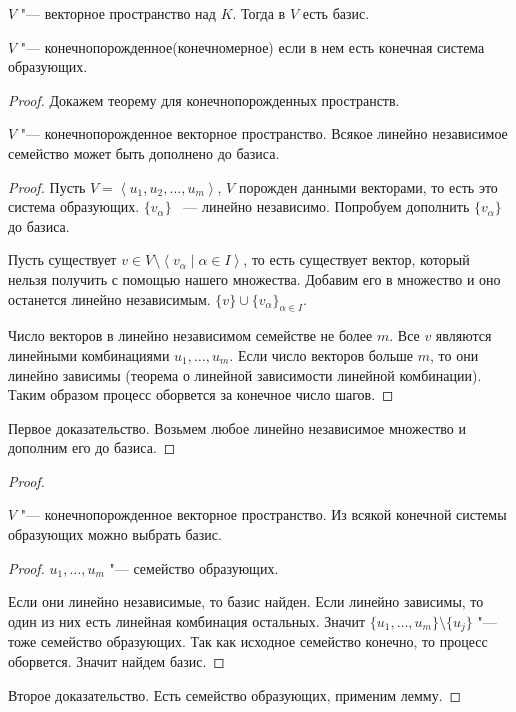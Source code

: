 \begin{theorem}
	$V$ "--- векторное пространство над $K$.
	Тогда в $V$ есть базис.
\end{theorem}

\begin{Def}
	$V$ "--- конечнопорожденное(конечномерное) если в нем есть
	конечная система образующих.
\end{Def}
\begin{proof}
	Докажем теорему для конечнопорожденных пространств.

	\begin{lemma}
		$V$ "--- конечнопорожденное векторное пространство.
		Всякое линейно независимое семейство может быть дополнено до базиса.
	\end{lemma}
	\begin{proof}
		Пусть $V = \left<u_1, u_2, \dots, u_m\right>$, $V$ порожден данными векторами, то есть это система образующих.
		$\{v_{\alpha}\}$ ~--- линейно независимо.
		Попробуем дополнить $\{v_{\alpha}\}$ до базиса.

		Пусть существует $v \in V \setminus \left<v_{\alpha} \mid \alpha \in I\right>$, то есть существует вектор,
		который нельзя получить с помощью нашего множества.
		Добавим его в множество и оно останется линейно независимым.
		$\{v\} \cup \{v_{\alpha}\}_{\alpha \in I}$.

		Число векторов в линейно независимом семействе не более $m$.
		Все $v$ являются линейными комбинациями $u_1, \dots, u_m$.
		Если число векторов больше $m$, то они линейно зависимы (теорема о линейной зависимости линейной комбинации).
		Таким образом процесс оборвется за конечное число шагов.
	\end{proof}

	Первое доказательство.
	Возьмем любое линейно независимое множество и дополним его до базиса.
\end{proof}

\begin{proof}
	\begin{lemma}
		$V$ "--- конечнопорожденное векторное пространство.
		Из всякой конечной системы образующих можно выбрать базис.
	\end{lemma}

	\begin{proof}
		$u_1, \dots, u_m$ "--- семейство образующих.

		Если они линейно независимые, то базис найден.
		Если линейно зависимы, то один из них есть линейная комбинация остальных.
		Значит $\{u_1, \dots, u_m\} \setminus \{u_j\}$ "--- тоже семейство образующих.
		Так как исходное семейство конечно, то процесс оборвется. Значит найдем базис.
	\end{proof}

	Второе доказательство.
	Есть семейство образующих, применим лемму.
\end{proof}

